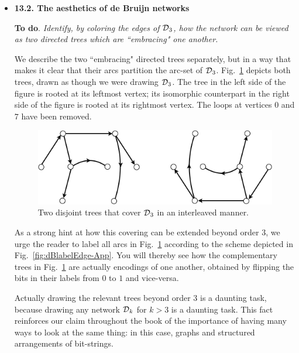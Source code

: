 \begin{itemize}
\item
{\bf 13.2. The aesthetics of de Bruijn networks}

\smallskip

{\bf To do}.
{\em Identify, by coloring the edges of $\mbox{$\cal D$}_3$, how the network can be viewed as two directed trees which are ``embracing" one another.}

\smallskip

We describe the two ``embracing" directed trees separately, but in a way that makes it clear that their arcs partition the arc-set of $\mbox{$\cal D$}_3$.  Fig.~\ref{fig:DeBruijn3Tree} depicts both trees, drawn as though we were drawing $\mbox{$\cal D$}_3$.  The tree in the left side of the figure is rooted at its leftmost vertex;  its isomorphic counterpart in the right side of the figure is rooted at its rightmost vertex.  The loops at vertices $0$ and $7$ have been removed. 
\begin{figure}[h]
\begin{center}
        \includegraphics[scale=0.4]{FiguresGraph/DeBruijn3Tree}
        \caption{Two disjoint trees that cover $\mbox{$\cal D$}_3$ in an interleaved manner.}
        \label{fig:DeBruijn3Tree}
\end{center}
\end{figure}

As a strong hint at how this covering can be extended beyond order $3$, we urge the reader to label all arcs in Fig.~\ref{fig:DeBruijn3Tree} according to the scheme depicted in Fig.~\ref{fig:dBlabelEdge-App}.  You will thereby see how the complementary trees in Fig.~\ref{fig:DeBruijn3Tree} are actually encodings of one another, obtained by flipping the bits in their labels from $0$ to $1$ and vice-versa.

\smallskip

Actually drawing the relevant trees beyond order $3$ is a daunting task, because drawing any network $\mbox{$\cal D$}_k$ for $k > 3$ is a daunting task.  This fact reinforces our claim throughout the book of the importance of having many ways to look at the same thing: in this case, graphs and structured arrangements of bit-strings.


\end{itemize}
